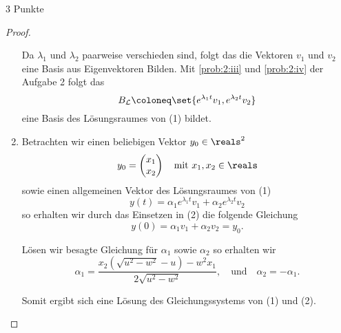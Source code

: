 \documentclass{problemset}
\begin{document}
\begin{problem}{3 Punkte}
\begin{proof}
\begin{enumerate}
              Da \(\lambda_1\) und \(\lambda_2\) paarweise verschieden sind,
              folgt das die Vektoren \(v_1\) und \(v_2\) eine Basis aus
              Eigenvektoren Bilden. Mit \autoref{prob:2:iii} und
              \autoref{prob:2:iv} der Aufgabe 2 folgt das
              \begin{equation*}
                  B_\mathcal{L} \coloneq \set{e^{\lambda_1 t}v_1, e^{\lambda_2 t}v_2}
              \end{equation*} eine Basis des Lösungsraumes von (1) bildet.

        \item Betrachten wir einen beliebigen Vektor \(y_0 \in \reals^2\)
              \begin{equation*}
                  y_0 = \begin{pmatrix}
                      x_1 \\ x_2
                  \end{pmatrix} \quad \text{mit } x_1, x_2 \in \reals
              \end{equation*} sowie einen allgemeinen Vektor des Lösungsraumes von (1)
              \begin{equation}
                  y(t) = \alpha_1 e^{\lambda_1 t} v_1 + \alpha_2 e^{\lambda_2 t} v_2
              \end{equation} so erhalten wir durch das Einsetzen in (2) die folgende Gleichung
              \begin{equation}
                  y(0) = \alpha_1 v_1 + \alpha_2 v_2 = y_0.
              \end{equation}

              Lösen wir besagte Gleichung für \(\alpha_1\) sowie \(\alpha_2\)
              so erhalten wir
              \begin{equation*}
                  \alpha_1 = \frac{x_2 (\sqrt{u^2 - w^2} - u) - w^2 x_1}{2\sqrt{u^2 -w^2}},
                  \quad \text{und} \quad
                  \alpha_2 = - \alpha_1.
              \end{equation*}

              Somit ergibt sich eine Lösung des Gleichungssystems von (1) und
              (2).
    \end{enumerate}
\end{proof}

\end{problem}
\end{document}
